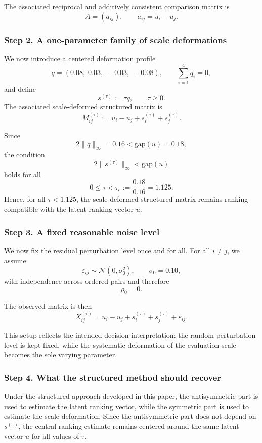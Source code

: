 \documentclass[11pt]{amsart}
\theoremstyle{definition}
\theoremstyle{plain}
\numberwithin{equation}{section}
\begin{document}
The associated reciprocal and additively consistent comparison matrix is
\[
A=(a_{ij}),\qquad a_{ij}=u_i-u_j.
\]

\subsubsection*{Step 2. A one-parameter family of scale deformations}

We now introduce a centered deformation profile
\[
q=(0.08,\;0.03,\;-0.03,\;-0.08),
\qquad \sum_{i=1}^4 q_i=0,
\]
and define
\[
s^{(\tau)}:=\tau q,
\qquad \tau\ge 0.
\]
The associated scale-deformed structured matrix is
\[
M^{(\tau)}_{ij}:=u_i-u_j+s^{(\tau)}_i+s^{(\tau)}_j.
\]

Since
\[
2\|q\|_\infty=0.16<\mathrm{gap}(u)=0.18,
\]
the condition
\[
2\|s^{(\tau)}\|_\infty<\mathrm{gap}(u)
\]
holds for all
\[
0\le \tau<\tau_c:=\frac{0.18}{0.16}=1.125.
\]
Hence, for all $\tau<1.125$, the scale-deformed structured matrix remains ranking-compatible with the latent ranking vector $u$.

\subsubsection*{Step 3. A fixed reasonable noise level}

We now fix the residual perturbation level once and for all. For all $i\neq j$, we assume
\[
\varepsilon_{ij}\sim \mathcal N(0,\sigma_0^2),
\qquad \sigma_0=0.10,
\]
with independence across ordered pairs and therefore
\[
\rho_0=0.
\]

The observed matrix is then
\[
X^{(\tau)}_{ij}=u_i-u_j+s^{(\tau)}_i+s^{(\tau)}_j+\varepsilon_{ij}.
\]

This setup reflects the intended decision interpretation: the random perturbation level is kept fixed, while the systematic deformation of the evaluation scale becomes the sole varying parameter.

\subsubsection*{Step 4. What the structured method should recover}

Under the structured approach developed in this paper, the antisymmetric part is used to estimate the latent ranking vector, while the symmetric part is used to estimate the scale deformation. Since the antisymmetric part does not depend on $s^{(\tau)}$, the central ranking estimate remains centered around the same latent vector $u$ for all values of $\tau$.
\end{document}
